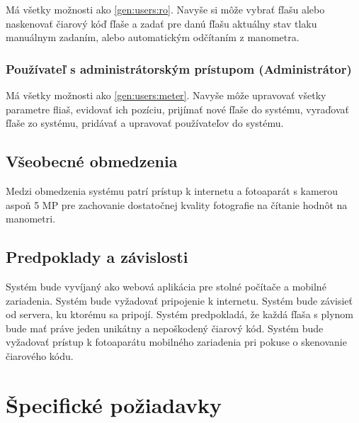 \documentclass[hreffootnote]{zah}
\begin{document}
Má všetky možnosti ako \ref{gen:users:ro}. Navyše si môže vybrať fľašu alebo naskenovať čiarový kóď fľaše a zadať pre danú fľašu aktuálny stav tlaku manuálnym zadaním, alebo automatickým odčítaním z manometra.

\subsubsection{Používateľ s administrátorským prístupom (Administrátor)}
\label{gen:users:admin}

Má všetky možnosti ako \ref{gen:users:meter}. Navyše môže upravovať všetky parametre fliaš, evidovať ich pozíciu, prijímať nové fľaše do systému, vyraďovať fľaše zo systému, pridávať a upravovať používateľov do systému.

\subsection{Všeobecné obmedzenia}
\label{gen:constraints}

Medzi obmedzenia systému patrí prístup k internetu a fotoaparát s kamerou aspoň 5 MP pre zachovanie dostatočnej kvality fotografie na čítanie hodnôt na manometri. 

\subsection{Predpoklady a závislosti}
\label{gen:deps}

Systém bude vyvíjaný ako webová aplikácia pre stolné počítače a mobilné zariadenia. Systém bude vyžadovať pripojenie k internetu. Systém bude závisieť od servera, ku ktorému sa pripojí. Systém predpokladá, že každá fľaša s plynom bude mať práve jeden unikátny a nepoškodený čiarový kód. Systém bude vyžadovať prístup k fotoaparátu mobilného zariadenia pri pokuse o skenovanie čiarového kódu.

\cleardoublepage
\section{Špecifické požiadavky}
\end{document}
